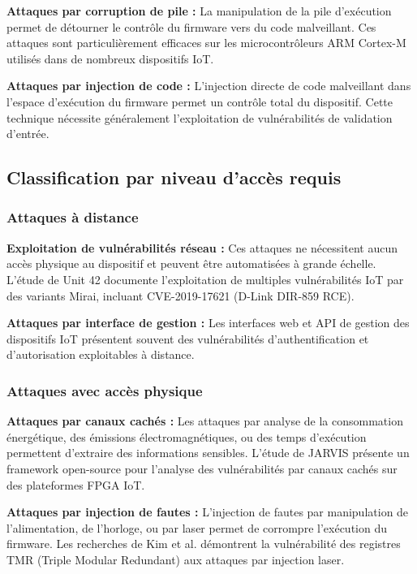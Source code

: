 \textbf{Attaques par corruption de pile :} La manipulation de la pile d'exécution permet de détourner le contrôle du firmware vers du code malveillant. Ces attaques sont particulièrement efficaces sur les microcontrôleurs ARM Cortex-M utilisés dans de nombreux dispositifs IoT.

\textbf{Attaques par injection de code :} L'injection directe de code malveillant dans l'espace d'exécution du firmware permet un contrôle total du dispositif. Cette technique nécessite généralement l'exploitation de vulnérabilités de validation d'entrée.

\subsection{Classification par niveau d'accès requis}

\subsubsection{Attaques à distance}

\textbf{Exploitation de vulnérabilités réseau :} Ces attaques ne nécessitent aucun accès physique au dispositif et peuvent être automatisées à grande échelle. L'étude de Unit 42 \cite{Unit42_2023MiraiExploits} documente l'exploitation de multiples vulnérabilités IoT par des variants Mirai, incluant CVE-2019-17621 (D-Link DIR-859 RCE).

\textbf{Attaques par interface de gestion :} Les interfaces web et API de gestion des dispositifs IoT présentent souvent des vulnérabilités d'authentification et d'autorisation exploitables à distance.

\subsubsection{Attaques avec accès physique}

\textbf{Attaques par canaux cachés :} Les attaques par analyse de la consommation énergétique, des émissions électromagnétiques, ou des temps d'exécution permettent d'extraire des informations sensibles. L'étude de JARVIS \cite{JARVIS2024SideChannel} présente un framework open-source pour l'analyse des vulnérabilités par canaux cachés sur des plateformes FPGA IoT.

\textbf{Attaques par injection de fautes :} L'injection de fautes par manipulation de l'alimentation, de l'horloge, ou par laser permet de corrompre l'exécution du firmware. Les recherches de Kim et al. \cite{Kim2024LaserFault} démontrent la vulnérabilité des registres TMR (Triple Modular Redundant) aux attaques par injection laser.


